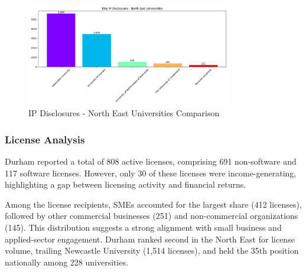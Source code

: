 \documentclass[journal,onecolumn, 10pt,draftclsnofoot]{IEEEtran}
\begin{document}

\begin{figure}[h]
\centering
\includegraphics[width=0.8\textwidth]{Fig/figure20.ip_ne_comparison.png}
\caption{IP Disclosures - North East Universities Comparison}
\label{fig:ip-ne-comparison}
\end{figure}

\subsubsection{License Analysis}

Durham reported a total of 808 active licenses, comprising 691 non-software and 117 software licenses. However, only 30 of these licenses were income-generating, highlighting a gap between licensing activity and financial returns.

Among the license recipients, SMEs accounted for the largest share (412 licenses), followed by other commercial businesses (251) and non-commercial organizations (145). This distribution suggests a strong alignment with small business and applied-sector engagement. Durham ranked second in the North East for license volume, trailing Newcastle University (1,514 licenses), and held the 35th position nationally among 228 universities.
\end{document}
